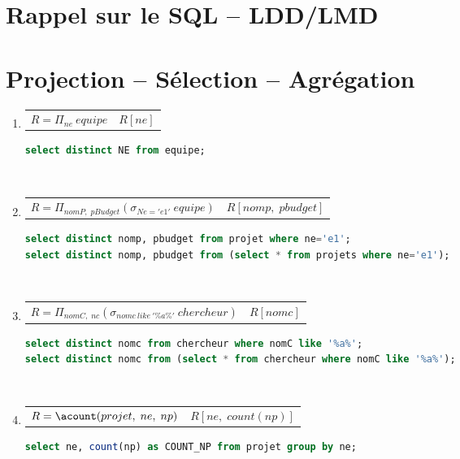 	\chapter{Rappel sur le SQL -- LDD/LMD }
	
	
	
	
	\chapter{Projection -- Sélection -- Agrégation}
	\begin{enumerate}
		\item 
			\begin{tabular}{p{8cm}p{4cm}}
			$R = \Pi_{ne}\ equipe$ & $R[ne]$
			\end{tabular}
	\begin{lstlisting}[language=SQL, numbers=none]
select distinct NE from equipe; 
	\end{lstlisting}
	 ~
\item 
			\begin{tabular}{p{8cm}p{4cm}}
		$R=\Pi_{nomP,\; pBudget}(\sigma_{Ne='e1'}\ equipe)$ & $R[nomp,\; pbudget]$
			\end{tabular}
	\begin{lstlisting}[language=SQL, numbers=none]
select distinct nomp, pbudget from projet where ne='e1'; 
select distinct nomp, pbudget from (select * from projets where ne='e1'); 
	\end{lstlisting}
	 ~
\item 
			\begin{tabular}{p{8cm}p{4cm}}
	$R = \Pi_{nomC,\; nc} (\sigma_{nomc\ {like}\ '\%a\%'}\ chercheur)$ & $R[nomc]$
			\end{tabular}
	\begin{lstlisting}[language=SQL, numbers=none]
select distinct nomc from chercheur where nomC like '%a%';
select distinct nomc from (select * from chercheur where nomC like '%a%'); 
	\end{lstlisting}
	 ~
\item 
			\begin{tabular}{p{8cm}p{4cm}}
	$R = \acount(projet,\; ne,\; np)$ & $R[ne,\; count(np)]$ 
			\end{tabular}
	\begin{lstlisting}[language=SQL, numbers=none]
select ne, count(np) as COUNT_NP from projet group by ne;
	\end{lstlisting}
	 ~


\end{enumerate}
